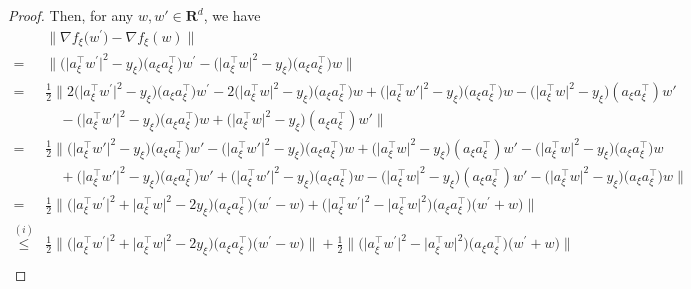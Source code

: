 \documentclass[10pt]{article} %
\newtheorem{proof}{Proof}
\begin{document}
\begin{proof}
Then, for any $w, w'\in \mathbf{R}^d$, we have
\begin{align}
& \big\|\nabla f_{\xi}\big(w^{\prime}\big)-\nabla f_{\xi}(w)\big\| \nonumber \\
=&\big\|\big(\big|a_{\xi}^{\top} w^{\prime}\big|^2-y_{\xi}\big)\big(a_{\xi} a_{\xi}^{\top}\big) w^{\prime}-\big(\big|a_{\xi}^{\top} w\big|^2-y_{\xi}\big)\big(a_{\xi} a_{\xi}^{\top}\big) w\big\| \nonumber \\
=& \frac{1}{2}\big\|2\big(\big|a_{\xi}^{\top} w^{\prime}\big|^2-y_{\xi}\big)\big(a_{\xi} a_{\xi}^{\top}\big) w^{\prime}-2\big(\big|a_{\xi}^{\top} w\big|^2-y_{\xi}\big)\big(a_{\xi} a_{\xi}^{\top}\big) w +\big(\big|a_{\xi}^{\top}w'\big|^2-y_{\xi}\big)\big(a_{\xi}a_{\xi}^{\top}\big)w-\big(\big|a_{\xi}^{\top}w\big|^2-y_{\xi}\big)(a_{\xi}a_{\xi}^{\top})w' \nonumber\\
&\quad -\big(\big|a_{\xi}^{\top}w'\big|^2-y_{\xi}\big)\big(a_{\xi}a_{\xi}^{\top}\big)w+\big(\big|a_{\xi}^{\top}w\big|^2-y_{\xi}\big)(a_{\xi}a_{\xi}^{\top})w'
\big\|\nonumber\\
=& \frac{1}{2}\big \|\big(\big|a_{\xi}^{\top} w'\big|^2-y_{\xi}\big)\big(a_{\xi} a_{\xi}^{\top}\big) w'-\big(\big|a_{\xi}^{\top}w'\big|^2-y_{\xi}\big)\big(a_{\xi}a_{\xi}^{\top}\big)w+\big(\big|a_{\xi}^{\top}w\big|^2-y_{\xi}\big)(a_{\xi}a_{\xi}^{\top})w'
-\big(\big|a_{\xi}^{\top} w\big|^2-y_{\xi}\big)\big(a_{\xi} a_{\xi}^{\top}\big) w \nonumber\\
&\quad+\big(\big|a_{\xi}^{\top} w'\big|^2-y_{\xi}\big)\big(a_{\xi} a_{\xi}^{\top}\big) w'+\big(\big|a_{\xi}^{\top}w'\big|^2-y_{\xi}\big)\big(a_{\xi}a_{\xi}^{\top}\big)w -\big(\big|a_{\xi}^{\top}w\big|^2-y_{\xi}\big)(a_{\xi}a_{\xi}^{\top})w'
-\big(\big|a_{\xi}^{\top} w\big|^2-y_{\xi}\big)\big(a_{\xi} a_{\xi}^{\top}\big) w\big \|\nonumber\\
=& \frac{1}{2}\big\|\big(\big|a_{\xi}^{\top} w^{\prime}\big|^2+\big|a_{\xi}^{\top} w\big|^2-2 y_{\xi}\big)\big(a_{\xi} a_{\xi}^{\top}\big)\big(w^{\prime}-w\big) +\big(\big|a_{\xi}^{\top} w^{\prime}\big|^2-\big|a_{\xi}^{\top} w\big|^2\big)\big(a_{\xi} a_{\xi}^{\top}\big)\big(w^{\prime}+w\big)\big\| \nonumber \\
\overset{(i)}{\leq} & \frac{1}{2}\big\|\big(\big|a_{\xi}^{\top} w^{\prime}\big|^2+\big|a_{\xi}^{\top} w\big|^2-2 y_{\xi}\big)\big(a_{\xi} a_{\xi}^{\top}\big)\big(w^{\prime}-w\big) \big \|
+\frac{1}{2}\big \|\big(\big|a_{\xi}^{\top} w^{\prime}\big|^2-\big|a_{\xi}^{\top} w\big|^2\big)\big(a_{\xi} a_{\xi}^{\top}\big)\big(w^{\prime}+w\big)\big\| \nonumber \\

\end{align}
\end{proof}
\end{document}
